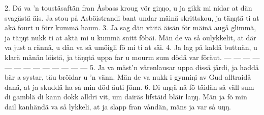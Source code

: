 2.  Dä va ’n toustäsaftän fran Åsbass kroug vör giŋŋo,
    u ja gikk mi nidar at dän svagästä äis.
    Ja stou på Asböistrandi bant undar mäinä skrittskou,
    ja täŋŋtä ti at akä fourt u förr kummä haum.
3.  Ja sag dän väitä äisän för mäinä augå glimmä,
    ja täŋŋt nukk ti at aktä mi u kummä snitt föbäi.
    Män de va så oulykkelit, at där va just a rännå,
    u dän va så umöigli fö mi ti at säi.
4.  Ja lag på kaldä buttnän, u klarä månän löistä,
    ja täŋŋtä uppa far u mourm sum dödä var föräut.
    — — — — — — — — — — — — —
5.  Ja va mäst’n värenlausar uppa dissä jårdi,
    ja haddä bär a systar, täu bröidar u ’n vänn.
    Män de va nukk i gynniŋi av Gud alltraidå danä,
    at ja skuddä ha så min död äuti ʃönn.
6.  Di uŋŋä nå fö täidän så väll sum di gamblä
    di kann dokk alldri vit, um dairäs lifstäid bläir laŋŋ.
    Män ja fö min dail kanhändä va så lykkeli,
    at ja slapp fran våndän, mäns ja var så uŋŋ.
